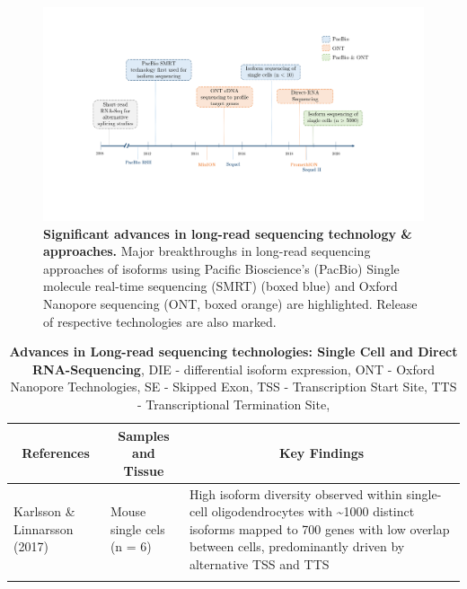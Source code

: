 \begin{changemargin}{1.5cm}
	\begin{landscape}
		\begin{figure}[]
			\includegraphics[page=1,trim={0 4cm 1.8cm 2cm},clip, scale = 0.8]{Figures/Introduction_Figures_Landscape.pdf}
			\caption[Timeline of Long-read Sequencing Technologies \& Approaches]%
			{\textbf{Significant advances in long-read sequencing technology \& approaches.} Major breakthroughs in long-read sequencing approaches of isoforms using Pacific Bioscience's (PacBio) Single molecule real-time sequencing (SMRT) (boxed blue) and Oxford Nanopore sequencing (ONT, boxed orange) are highlighted. Release of respective technologies are also marked.}
			\label{fig:longread_timeline}
		\end{figure}
	\end{landscape}
	
	
	\begin{landscape}
		\small %
		\setlength\tabcolsep{2pt} %
		\renewcommand{\arraystretch}{1}
		\begin{longtable}[c]{p{4cm}p{4cm}p{18cm}}
			\caption[Advances in Long-read sequencing technologies: Single Cell and Direct RNA-Sequencing]%
			{\textbf{Advances in Long-read sequencing technologies: Single Cell and Direct RNA-Sequencing}, DIE - differential isoform expression, ONT - Oxford Nanopore Technologies, SE - Skipped Exon, TSS - Transcription Start Site, TTS - Transcriptional Termination Site, }
			\label{tab: longread_advancedstudies}\\
			
			\toprule
			\multicolumn{1}{c}{References} &
			\multicolumn{1}{c}{Samples and Tissue} &
			\multicolumn{1}{c}{Key Findings} \\* \midrule
			\endfirsthead
			\endhead
			\bottomrule
			\endfoot
			\endlastfoot
			\centering Karlsson \& Linnarsson (2017)\cite{Karlsson2017} &
			\centering Mouse single cels (n = 6)  &
			\tabitem High isoform diversity observed within single-cell oligodendrocytes with \textasciitilde1000 distinct isoforms mapped to 700 genes with low overlap between cells, predominantly driven by alternative TSS and TTS \\
			\hdashline[0.5pt/5pt]	
			

\end{longtable}
\end{landscape}
\end{changemargin}
